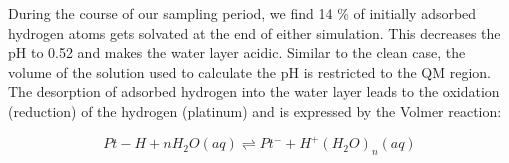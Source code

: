 During the course of our sampling period, we find 14 \% of initially adsorbed hydrogen atoms gets solvated at the end of either simulation. This decreases the pH to 0.52 and makes the water layer acidic. Similar to the clean case, the volume of the solution used to calculate the pH is restricted to the QM region. The desorption of adsorbed hydrogen into the water layer leads to the oxidation (reduction) of the hydrogen (platinum) and is expressed by the Volmer reaction:       

\begin{equation}
    \label{}
    Pt-H + nH_2O (aq) \rightleftharpoons Pt ^- + H^+(H_2O)_n (aq)
\end{equation}





